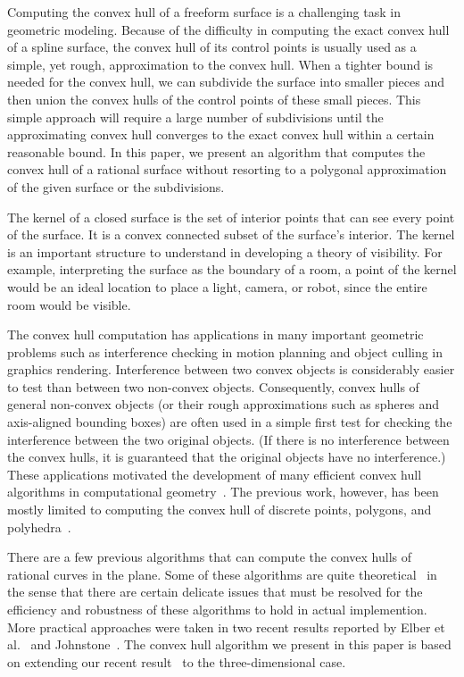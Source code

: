 \documentclass[doublespacing]{elsart}
\begin{document}
Computing the convex hull of a freeform surface
is a challenging task in geometric modeling.
Because of the difficulty in computing the exact convex hull
of a spline surface, the convex hull of its control points is usually
used as a simple, yet rough, approximation to the convex hull.
When a tighter bound is needed for the convex hull, we can subdivide
the surface into smaller pieces and then union the convex hulls of
the control points of these small pieces. 
This simple approach will require a large number of subdivisions 
until the approximating convex hull converges to the exact convex hull
within a certain reasonable bound.  In this paper, we present
an algorithm that computes the convex hull of a rational surface
without resorting to a polygonal approximation of the given surface
or the subdivisions.

The kernel of a closed surface is the set of interior points
that can see every point of the surface.
It is a convex connected subset of the surface's interior.
The kernel is an important structure to understand in developing a theory of visibility.
For example, interpreting the surface as the boundary of a room,
a point of the kernel would be an ideal location to place a light, camera, or robot,
since the entire room would be visible.

The convex hull computation has applications in many important
geometric problems such as interference checking in motion planning
and object culling in graphics rendering.  Interference between two convex
objects is considerably easier to test than between two non-convex objects.
Consequently, convex hulls of general non-convex objects (or their rough
approximations such as spheres and axis-aligned bounding boxes) are often used
in a simple first test for checking the interference between the two
original objects.   (If there is no interference between the convex hulls,
it is guaranteed that the original objects have no interference.)
These applications motivated the development of many efficient
convex hull algorithms in computational geometry~\cite{Prep85}.
The previous work, however, has been mostly limited to computing
the convex hull of discrete points, polygons, and
polyhedra~\cite{Graham83,Lee83,Prep85}.

There are a few previous algorithms that can compute the convex hulls
of rational curves in the plane.  Some of these algorithms are quite
theoretical~\cite{Kim91,Souvaine90,Schaeffer87} in the sense that
there are certain delicate issues that must be resolved for the efficiency
and robustness of these algorithms to hold in actual implemention.
More practical approaches were taken in two recent results reported
by Elber et al.~\cite{Elber2001b} and Johnstone~\cite{Johnstone2001}.
The convex hull algorithm we present in this paper is based on
extending our recent result~\cite{Elber2001b} to the three-dimensional case.
\end{document}
